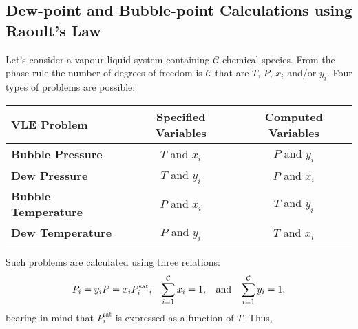 \subsection{Dew-point and Bubble-point Calculations using Raoult’s Law }

Let's consider a vapour-liquid system containing $\mathcal{C}$ chemical species. From the phase rule the number of degrees of freedom is $\mathcal{C}$ that are $T$, $P$, $x_{i}$ and/or $y_{i}$. Four types of problems are possible:
\begin{center}
   \begin{tabular}{|l c c|}
      \hline 
      $\mathbf{VLE}$ {\bf Problem} & {\bf Specified Variables} &  {\bf Computed Variables} \\  
      \hline
          {\bf Bubble Pressure}        &  $T$ and $x_{i}$           &   $P$ and $y_{i}$          \\
          {\bf Dew Pressure}           &  $T$ and $y_{i}$           &   $P$ and $x_{i}$          \\
          {\bf Bubble Temperature}     &  $P$ and $x_{i}$           &   $T$ and $y_{i}$          \\
          {\bf Dew Temperature}        &  $P$ and $y_{i}$           &   $T$ and $x_{i}$          \\     
      \hline
   \end{tabular}
\end{center}
Such problems are calculated using three relations:
\begin{displaymath}
    P_{i} = y_{i}P = x_{i}P_{i}^{\text{sat}}, \;\;\; \summation[x_{i}]{i=1}{\mathcal{C}} = 1, \;\;\text{ and }\;\; \summation[y_{i}]{i=1}{\mathcal{C}} = 1,
\end{displaymath}
bearing in mind that $P_{i}^{\text{sat}}$ is expressed as a function of $T$. Thus,

